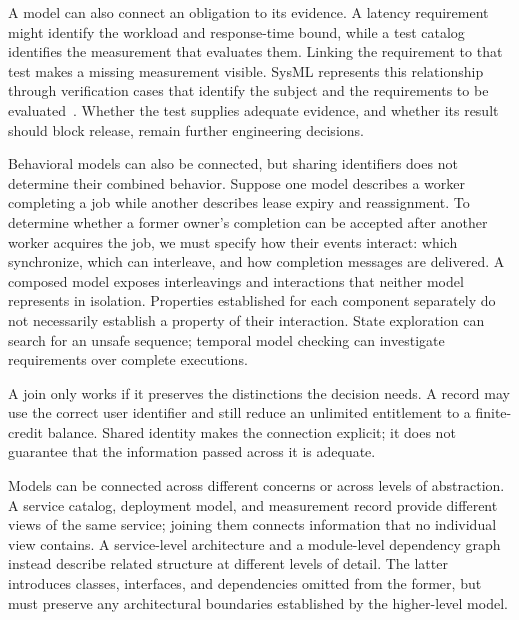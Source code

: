 A model can also connect an obligation to its evidence. A latency requirement might identify the workload and response-time bound, while a test catalog identifies the measurement that evaluates them. Linking the requirement to that test makes a missing measurement visible. SysML represents this relationship through verification cases that identify the subject and the requirements to be evaluated~\citep{omg2025sysml}. Whether the test supplies adequate evidence, and whether its result should block release, remain further engineering decisions.

Behavioral models can also be connected, but sharing identifiers does not determine their combined behavior. Suppose one model describes a worker completing a job while another describes lease expiry and reassignment. To determine whether a former owner's completion can be accepted after another worker acquires the job, we must specify how their events interact: which synchronize, which can interleave, and how completion messages are delivered. A composed model exposes interleavings and interactions that neither model represents in isolation. Properties established for each component separately do not necessarily establish a property of their interaction. State exploration can search for an unsafe sequence; temporal model checking can investigate requirements over complete executions.


A join only works if it preserves the distinctions the decision needs. A record may use the correct user identifier and still reduce an unlimited entitlement to a finite-credit balance. Shared identity makes the connection explicit; it does not guarantee that the information passed across it is adequate.

Models can be connected across different concerns or across levels of abstraction. A service catalog, deployment model, and measurement record provide different views of the same service; joining them connects information that no individual view contains. A service-level architecture and a module-level dependency graph instead describe related structure at different levels of detail. The latter introduces classes, interfaces, and dependencies omitted from the former, but must preserve any architectural boundaries established by the higher-level model.

